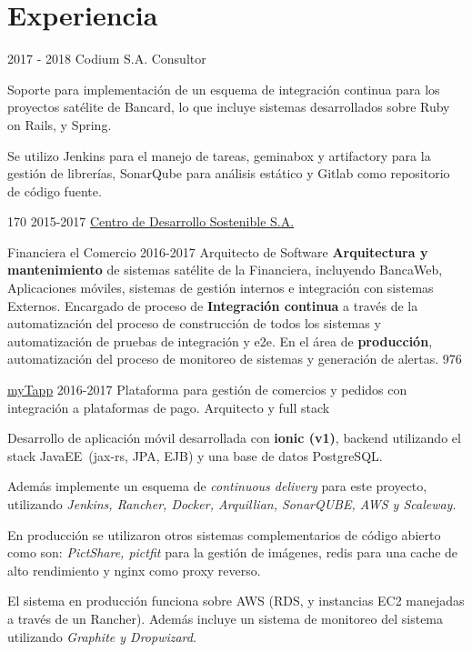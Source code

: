 \documentclass[]{friggeri-cv}
\begin{document}
\section{Experiencia}
\begin{entrylist}
\entry
    {2017 - 2018}
    {Codium S.A.}
    {Consultor}
    {Soporte para implementación de un esquema de integración continua para los proyectos satélite
    de Bancard, lo que incluye sistemas desarrollados sobre Ruby on Rails, y Spring.
    
    Se utilizo Jenkins para el manejo de tareas, geminabox y artifactory para la gestión de librerías,
    SonarQube para análisis estático y Gitlab como repositorio de código fuente.
    }
    {170}
\entry
    {2015-2017}
    {\href{http://www.cds.com.py}{Centro de Desarrollo Sostenible S.A.}}
    {}
    {\proyecto
        {Financiera el Comercio}
        {2016-2017}
        {}
        {Arquitecto de Software}
        {\textbf{Arquitectura y mantenimiento} de sistemas satélite de la Financiera, incluyendo BancaWeb, Aplicaciones móviles, sistemas de gestión internos e integración con sistemas Externos. Encargado de proceso de 
        \textbf{Integración continua} a través de la automatización del proceso de construcción de todos los sistemas y automatización de pruebas de integración y e2e. En el área de \textbf{producción}, automatización del proceso de monitoreo de sistemas y generación de alertas.
        } 
        {976}
    
    \proyecto
        {\href{https://www.mytappweb.com}{myTapp}}
        {2016-2017}
        {Plataforma para gestión de comercios y pedidos con integración a plataformas de pago.}
        {Arquitecto y full stack}
        {
        Desarrollo de aplicación móvil desarrollada con  \textbf{ionic (v1)}, 
        backend utilizando el stack JavaEE~(jax-rs, JPA, EJB) y una base de datos
        PostgreSQL.
        
		Además implemente un esquema de \textit{continuous delivery} para este proyecto,
        utilizando \textit{Jenkins, Rancher, Docker, Arquillian, SonarQUBE, AWS y Scaleway}. 
        
        En producción se utilizaron  otros sistemas complementarios de código abierto 
        como son: \textit{PictShare, pictfit} para la gestión de imágenes, redis para una
        cache de alto rendimiento y nginx como proxy reverso.
        
        El sistema en producción funciona sobre AWS (RDS, y instancias EC2 manejadas a 
        través de un Rancher). Además incluye un sistema de monitoreo del sistema
        utilizando \textit{Graphite y Dropwizard}.
        } 
        {}
        
}
\end{entrylist}
\end{document}

